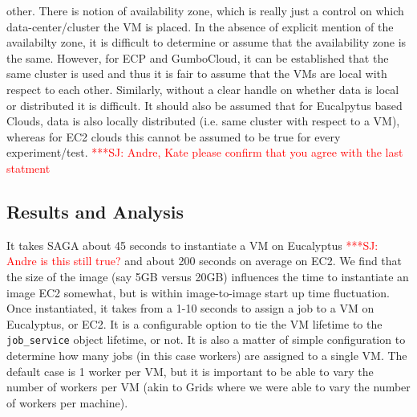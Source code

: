 \documentclass[conference,final]{IEEEtran}
\newcommand{\jhanote}[1]{ {\textcolor{red} { ***SJ: #1 }}}
\newcommand{\jhanote}[1]{}
\begin{document}
other. There is notion of availability zone, which is really just a
control on which data-center/cluster the VM is placed. In the absence
of explicit mention of the availabilty zone, it is difficult to
determine or assume that the availability zone is the same. However,
for ECP and GumboCloud, it can be established that the same cluster is
used and thus it is fair to assume that the VMs are local with respect
to each other.  Similarly, without a clear handle on whether data is
local or distributed it is difficult.  It should also be assumed that
for Eucalpytus based Clouds, data is also locally distributed (i.e.
same cluster with respect to a VM), whereas for EC2 clouds this cannot
be assumed to be true for every experiment/test. \jhanote{Andre, Kate
  please confirm that you agree with the last statment}

\subsection{Results and Analysis}


It takes SAGA about 45 seconds to instantiate a VM on Eucalyptus
\jhanote{Andre is this still true?}  and about 200 seconds on average
on EC2.  We find that the size of the image (say 5GB versus 20GB)
influences the time to instantiate an image EC2 somewhat, but is
within image-to-image start up time fluctuation.  Once instantiated,
it takes from a 1-10 seconds to assign a job to a VM on Eucalyptus, or
EC2.  It is a configurable option to tie the VM lifetime to the
\texttt{job\_service} object lifetime, or not.  It is also a matter of
simple configuration to determine how many jobs (in this case workers)
are assigned to a single VM. The default case is 1 worker per VM, but
it is important to be able to vary the number of workers per VM (akin
to Grids where we were able to vary the number of workers per
machine).
\end{document}
